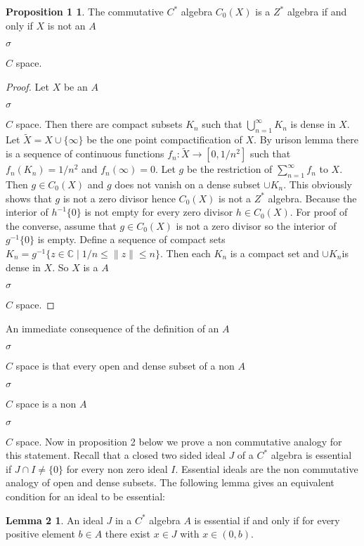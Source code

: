 \documentclass[a4paper,10pt]{amsart}
\theoremstyle{definition}
\newtheorem*{prop1}{Proposition  1}
\newtheorem*{lem2} {Lemma      2}
\theoremstyle{plain}
\begin{document}
\begin{prop1}
The  commutative  $C^{*}$  algebra $C_{0}(X)$ is  a  $Z^{*}$  algebra if  and  only  if $X$ is  not  an $A$\begin{Large}${\sigma}$\end{Large}$C$  space.
\end{prop1}
\begin{proof}
Let $X$  be an $A$\begin{Large}${\sigma}$\end{Large}$C$  space. Then there are compact  subsets  $K_{n}$  such that $\bigcup_{n=1}^{\infty} K_{n}$ is  dense in $X$. Let $\widetilde{X}=X \cup \{\infty\}$ be the one  point  compactification  of $X$. By urison lemma there is a  sequence of continuous functions $f_{n}:\widetilde{X}\rightarrow [0, 1/n^{2}]$  such that
$f_{n}(K_{n})=1/n^{2}$ and $f_{n}(\infty)=0$. Let $g$ be the restriction of  $\sum_{n=1}^{\infty} f_{n}$ to $X$. Then  $g\in C_{0}(X)$ and $g$  does not  vanish on a  dense subset $\cup K_{n}$. This  obviously  shows that $g$ is  not  a zero divisor hence $C_{0}(X)$ is  not a $Z^{*}$  algebra.  Because the  interior of $h^{-1} \{0\}$  is   not  empty for  every  zero  divisor  $h\in C_{0}(X)$.  For proof  of  the  converse, assume that $g\in C_{0}(X)$ is  not a zero divisor so the interior of $g^{-1}\{0\}$ is empty. Define  a sequence of compact sets  $K_{n}=g^{-1} \{z\in \mathbb{C} \mid 1/n\leq \parallel z \parallel \leq n \}$.
Then each $K_{n}$ is  a compact set and $\cup K_{n}$is dense in $X$. So $X$ is  a $A$\begin{Large}${\sigma}$\end{Large}$C$  space.
\end{proof}

An immediate  consequence of the definition of an $A$\begin{Large}${\sigma}$\end{Large}$C$  space is that every open and  dense subset of a non $A$\begin{Large}${\sigma}$\end{Large}$C$  space is a  non $A$\begin{Large}${\sigma}$\end{Large}$C$  space. Now in  proposition 2 below  we  prove  a non commutative  analogy for this  statement. Recall that a  closed two  sided ideal $J$  of  a  $C^{*}$  algebra  is essential if $J \cap I\neq \{0\}$ for  every  non zero ideal $I$.  Essential ideals  are the  non commutative  analogy of open and dense subsets. The  following  lemma  gives an equivalent condition for an ideal to be  essential:
\begin{lem2}
An ideal $J$ in  a  $C^{*}$ algebra $A$  is  essential if and only if for every positive  element $b\in A$ there exist   $x\in J$ with $x\in (0, b)$.
\end{lem2}
\end{document}
